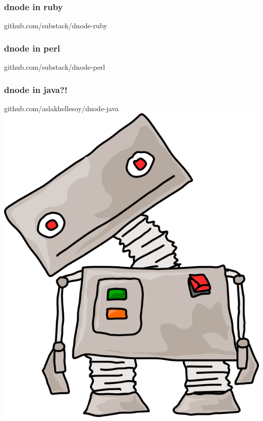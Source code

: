 \documentclass{beamer}
\begin{document}
\begin{frame}
    \frametitle{dnode in ruby}
    \begin{center}
        \huge
        github.com/substack/dnode-ruby
        \newline
        \normalsize
        \fbox{}
    \end{center}
\end{frame}

\begin{frame}
    \frametitle{dnode in perl}
    \begin{center}
        \huge
        github.com/substack/dnode-perl
        \newline
        \normalsize
        \fbox{}
    \end{center}
\end{frame}

\begin{frame}
    \frametitle{dnode in java?!}
    \begin{center}
        \huge
        github.com/aslakhellesoy/dnode-java
        \newline
        \includegraphics[scale=0.6]{images/robot_stare.png}
    \end{center}
\end{frame}
\end{document}
